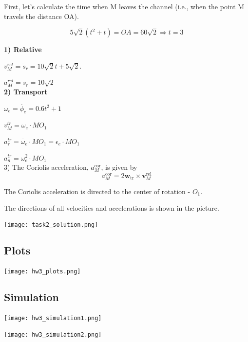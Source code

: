 \documentclass{article}
\begin{document}
First, let's calculate the time when M leaves the channel (i.e., when the point M travels the distance OA).

\[5\sqrt{2}(t^2 + t) = OA = 60\sqrt{2} \Rightarrow t = 3 \]

\textbf{1) Relative}

$v_{M}^{rel} = \dot{s}_r = 10\sqrt{2} t + 5\sqrt{2}$.

$a_{M}^{rel} = \ddot{s}_r = 10\sqrt{2}$\\
\textbf{2) Transport}

$\omega_e = \dot{\phi_e} = 0.6t^2 + 1$

$v_{M}^{tr} = \omega_e \cdot {MO_1}$

$a_{\tau}^{tr} = \dot{\omega_e} \cdot {MO_1} = \epsilon_e \cdot {MO_1}$

$a_{n}^{tr} = \omega_e^2 \cdot {MO_1}$\\
3) The Coriolis acceleration, \(a_{M}^{\text{cor}}\), is given by
\[
a_{M}^{\text{cor}} = 2 \mathbf{w}_{\text{tr}} \times \mathbf{v}_{M}^{\text{rel}}
\]

The Coriolis acceleration is directed to the center of rotation - $O_1$.

The directions of all velocities and accelerations is shown in the picture.

\begin{minipage}{0.8\textwidth}
    \texttt{[image: task2\_solution.png]}
\end{minipage}

\subsection{Plots}
\texttt{[image: hw3\_plots.png]}

\subsection{Simulation}

\texttt{[image: hw3\_simulation1.png]}

\texttt{[image: hw3\_simulation2.png]}
\end{document}
